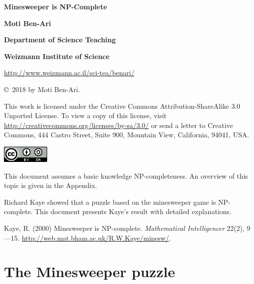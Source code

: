 \documentclass[11pt,a4paper]{article}
\begin{document}
\begin{center}

\textbf{\huge Minesweeper is NP-Complete}

\bigskip
\bigskip
\bigskip

\textbf{\LARGE Moti Ben-Ari}

\bigskip

\textbf{\Large Department of Science Teaching}

\bigskip

\textbf{\Large Weizmann Institute of Science}

\bigskip

\url{http://www.weizmann.ac.il/sci-tea/benari/}

\end{center}

\bigskip
\bigskip

\begin{center}
\copyright{}\  2018 by Moti Ben-Ari.
\end{center}

This work is licensed under the Creative Commons Attribution-ShareAlike 3.0 Unported License. To view a copy of this license, visit \url{http://creativecommons.org/licenses/by-sa/3.0/} or send a letter to Creative Commons, 444 Castro Street, Suite 900, Mountain View, California, 94041, USA.

\bigskip

\begin{center}
\includegraphics[width=.2\textwidth]{../by-sa.png}
\end{center}

\thispagestyle{empty}

\newpage

This document assumes a basic knowledge NP-completeness. An overview of this topic is given in the Appendix.


Richard Kaye showed that a puzzle based on the minesweeper game is NP-complete. This document presents Kaye's result with detailed explanations.

Kaye, R. (2000) Minesweeper is NP-complete. \textit{Mathematical Intelligencer} 22(2), 9—15. \url{http://web.mat.bham.ac.uk/R.W.Kaye/minesw/}.


\section{The Minesweeper puzzle}
\end{document}
